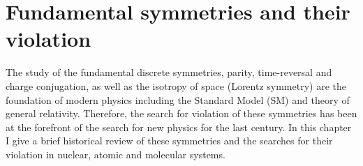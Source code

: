 \documentclass[10pt,a4paper, twoside, openright]{report}
\begin{document}
\chapter{Fundamental symmetries and their violation} \label{chap:Violation}
The study of the fundamental discrete symmetries, parity, time-reversal and charge conjugation, as well as the isotropy of space (Lorentz symmetry) are the foundation of modern physics including the Standard Model (SM) and theory of general relativity. Therefore, the search for violation of these symmetries has been at the forefront of the search for new physics for the last century. In this chapter I give a brief historical review of these symmetries and the searches for their violation in nuclear, atomic and molecular systems. 
\end{document}

